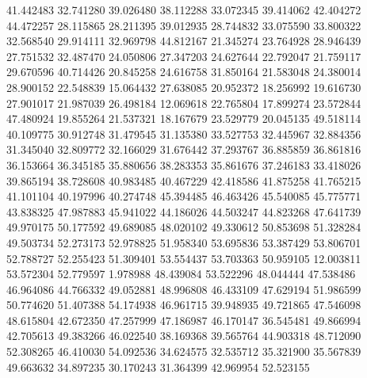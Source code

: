 41.442483
32.741280
39.026480
38.112288
33.072345
39.414062
42.404272
44.472257
28.115865
28.211395
39.012935
28.744832
33.075590
33.800322
32.568540
29.914111
32.969798
44.812167
21.345274
23.764928
28.946439
27.751532
32.487470
24.050806
27.347203
24.627644
22.792047
21.759117
29.670596
40.714426
20.845258
24.616758
31.850164
21.583048
24.380014
28.900152
22.548839
15.064432
27.638085
20.952372
18.256992
19.616730
27.901017
21.987039
26.498184
12.069618
22.765804
17.899274
23.572844
47.480924
19.855264
21.537321
18.167679
23.529779
20.045135
49.518114
40.109775
30.912748
31.479545
31.135380
33.527753
32.445967
32.884356
31.345040
32.809772
32.166029
31.676442
37.293767
36.885859
36.861816
36.153664
36.345185
35.880656
38.283353
35.861676
37.246183
33.418026
39.865194
38.728608
40.983485
40.467229
42.418586
41.875258
41.765215
41.101104
40.197996
40.274748
45.394485
46.463426
45.540085
45.775771
43.838325
47.987883
45.941022
44.186026
44.503247
44.823268
47.641739
49.970175
50.177592
49.689085
48.020102
49.330612
50.853698
51.328284
49.503734
52.273173
52.978825
51.958340
53.695836
53.387429
53.806701
52.788727
52.255423
51.309401
53.554437
53.703363
50.959105
12.003811
53.572304
52.779597
1.978988
48.439084
53.522296
48.044444
47.538486
46.964086
44.766332
49.052881
48.996808
46.433109
47.629194
51.986599
50.774620
51.407388
54.174938
46.961715
39.948935
49.721865
47.546098
48.615804
42.672350
47.257999
47.186987
46.170147
36.545481
49.866994
42.705613
49.383266
46.022540
38.169368
39.565764
44.903318
48.712090
52.308265
46.410030
54.092536
34.624575
32.535712
35.321900
35.567839
49.663632
34.897235
30.170243
31.364399
42.969954
52.523155
